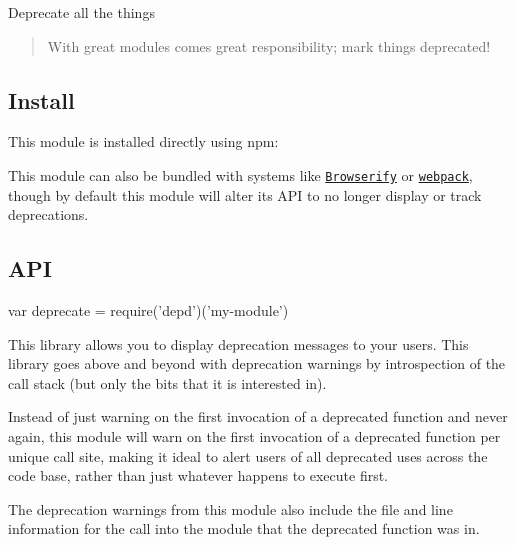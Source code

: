 \href{https://npmjs.org/package/depd}{\tt } \href{https://npmjs.org/package/depd}{\tt } \href{http://nodejs.org/download/}{\tt } \href{https://travis-ci.org/dougwilson/nodejs-depd}{\tt } \href{https://ci.appveyor.com/project/dougwilson/nodejs-depd}{\tt } \href{https://coveralls.io/r/dougwilson/nodejs-depd?branch=master}{\tt } \href{https://www.gratipay.com/dougwilson/}{\tt }

Deprecate all the things

\begin{quote}
With great modules comes great responsibility; mark things deprecated! \end{quote}


\subsection*{Install}

This module is installed directly using {\ttfamily npm}\+:




This module can also be bundled with systems like \href{http://browserify.org/}{\tt Browserify} or \href{https://webpack.github.io/}{\tt webpack}, though by default this module will alter it\textquotesingle{}s A\+PI to no longer display or track deprecations.

\subsection*{A\+PI}


\begin{DoxyCode}
var deprecate = require('depd')('my-module')
\end{DoxyCode}


This library allows you to display deprecation messages to your users. This library goes above and beyond with deprecation warnings by introspection of the call stack (but only the bits that it is interested in).

Instead of just warning on the first invocation of a deprecated function and never again, this module will warn on the first invocation of a deprecated function per unique call site, making it ideal to alert users of all deprecated uses across the code base, rather than just whatever happens to execute first.

The deprecation warnings from this module also include the file and line information for the call into the module that the deprecated function was in.

